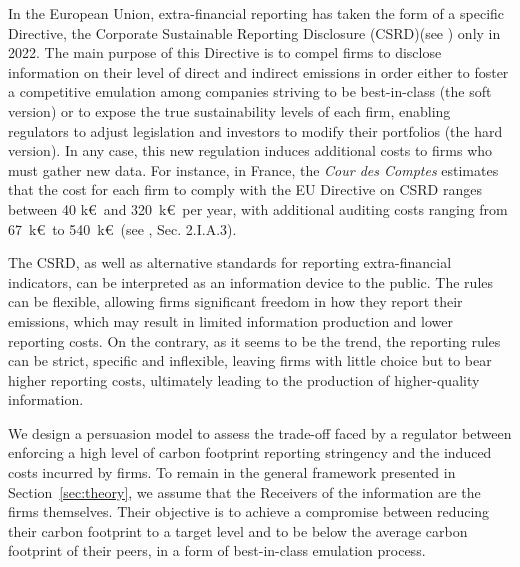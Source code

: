 \documentclass[a4paper,10pt]{article}
\theoremstyle{definition}
\theoremstyle{plain}
\numberwithin{equation}{section}
\begin{document}
In the European Union, extra-financial reporting has taken the form of a specific Directive, the Corporate Sustainable Reporting Disclosure (CSRD)(see  \cite{Directive22}) only in 2022. The main purpose of this Directive is to compel firms to disclose information on their level of direct and indirect emissions in order either to foster a competitive emulation among companies striving to be best-in-class (the soft version) or to expose the true sustainability levels of each firm, enabling regulators to adjust legislation and investors to modify their portfolios (the hard version). In any case, this new regulation induces additional costs to firms who must gather new data.  For instance, in France, the {\em Cour des Comptes} estimates that the cost for each firm to comply  with the EU Directive on CSRD ranges between 40 k\euro~and 320~k\euro~per year, with additional auditing costs ranging from 67~k\euro~to 540~k\euro~(see \cite{Cour24}, Sec. 2.I.A.3). 

\medskip

The CSRD, as well as alternative standards for reporting extra-financial indicators, can be interpreted as an information device to the public. The rules can be flexible, allowing firms significant freedom in how they report their emissions, which may result in limited information production and lower reporting costs.  On the contrary, as it seems to be the trend, the reporting rules can be strict, specific and inflexible, leaving firms with little choice but to bear higher reporting costs, ultimately leading to the production of higher-quality information. 

\medskip

We design a persuasion model to assess the trade-off faced by a regulator between enforcing a high level of carbon footprint reporting stringency and the induced costs incurred by firms. To remain in the general framework presented in Section~\ref{sec:theory}, we assume that the Receivers of the information are the firms themselves. Their objective is to achieve a compromise between reducing their carbon footprint to a target level and to be below the average carbon footprint of their peers, in a form of best-in-class emulation process.

\medskip
\end{document}
